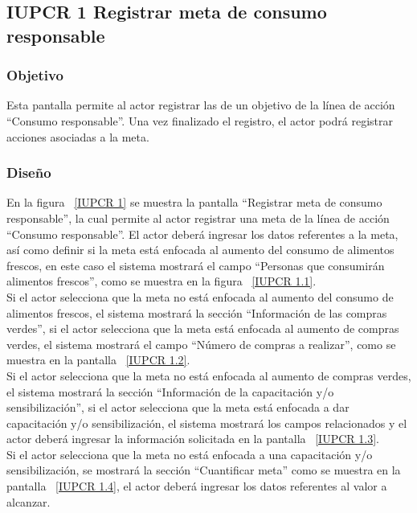 \subsection{IUPCR 1 Registrar meta de consumo responsable}
                     
\subsubsection{Objetivo}

   Esta pantalla permite al actor registrar las  de un objetivo de la línea de acción ``Consumo responsable''. Una vez finalizado el registro, el actor podrá registrar acciones asociadas a la meta.

	
\subsubsection{Diseño}

  En la figura ~\ref{IUPCR 1} se muestra la pantalla ``Registrar meta de consumo responsable'',
  la cual permite al actor registrar una meta de la línea de acción ``Consumo responsable''. 
  El actor deberá ingresar los datos referentes a la meta, así como definir si la meta está enfocada al aumento del consumo de alimentos frescos, 
  en este caso el sistema mostrará el campo ``Personas que consumirán alimentos frescos'', como se muestra en la figura ~\ref{IUPCR 1.1}.\\
  
  Si el actor selecciona que la meta no está enfocada al aumento del consumo de alimentos frescos, el sistema mostrará la sección ``Información de las compras verdes'',
  si el actor selecciona que la meta está enfocada al aumento de compras verdes, el sistema mostrará el campo ``Número de compras a realizar'', como se muestra en la pantalla ~\ref{IUPCR 1.2}.\\
  
    
  Si el actor selecciona que la meta no está enfocada al aumento de compras verdes, el sistema mostrará la sección ``Información de la capacitación y/o sensibilización'',
  si el actor selecciona que la meta está enfocada a dar capacitación y/o sensibilización, el sistema mostrará los campos relacionados y
  el actor deberá ingresar la información solicitada en la pantalla ~\ref{IUPCR 1.3}.\\
    
  Si el actor selecciona que la meta no está enfocada a una capacitación y/o sensibilización, se mostrará la sección ``Cuantificar meta'' como se muestra en la pantalla ~\ref{IUPCR 1.4}, el actor 
  deberá ingresar los datos referentes al valor a alcanzar.\\
 
